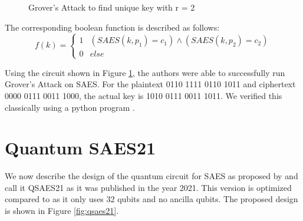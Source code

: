 \documentclass[preprint]{transcrypto}
\begin{document}
\begin{figure}[h!]
    
    
    \caption{Grover's Attack to find unique key with r = 2}
    \label{fig:grov18u}
\end{figure}

The corresponding boolean function is described as follows:
\begin{equation*}
 f(k) = 
 \begin{cases} 
      1 & (SAES(k, p_1) = c_1) \wedge (SAES(k, p_2) = c_2) \\
      0 & else 
  \end{cases}
\end{equation*}

Using the circuit shown in Figure \ref{fig:grov18u}, the authors were able to successfully run Grover's Attack on SAES. For the plaintext 0110 1111 0110 1011 and ciphertext 0000 0111 0011 1000, the actual key is 1010 0111 0011 1011. We verified this classically using a python program \cite{Gopal}.

\section{Quantum SAES21}\label{sec:qsaes21}
We now describe the design of the quantum circuit for SAES as proposed by \cite{Jang} and call it QSAES21 as it was published in the year 2021. This version is optimized compared to \cite{Almazrooie} as it only uses 32 qubits and no ancilla qubits. The proposed design is shown in Figure \ref{fig:qsaes21}. 
\end{document}
